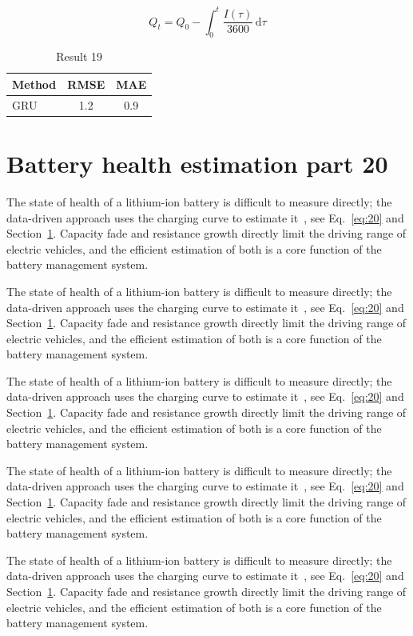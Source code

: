 \documentclass[11pt]{article}
\begin{document}
\begin{equation}\label{eq:19}
  Q_t = Q_0 - \int_0^t \frac{I(\tau)}{3600}\,\mathrm{d}\tau
\end{equation}
\begin{table}[h]\centering\begin{tabular}{lcc}\toprule Method & RMSE & MAE\\\midrule GRU & 1.2 & 0.9\\\bottomrule\end{tabular}\caption{Result 19}\end{table}

\section{Battery health estimation part 20}\label{sec:20}
The state of health of a lithium-ion battery is difficult to measure directly; the data-driven approach uses the charging curve to estimate it~\cite{a2020}, see Eq.~\eqref{eq:20} and Section~\ref{sec:20}. Capacity fade and resistance growth directly limit the driving range of electric vehicles, and the efficient estimation of both is a core function of the battery management system.

The state of health of a lithium-ion battery is difficult to measure directly; the data-driven approach uses the charging curve to estimate it~\cite{a2020}, see Eq.~\eqref{eq:20} and Section~\ref{sec:20}. Capacity fade and resistance growth directly limit the driving range of electric vehicles, and the efficient estimation of both is a core function of the battery management system.

The state of health of a lithium-ion battery is difficult to measure directly; the data-driven approach uses the charging curve to estimate it~\cite{a2020}, see Eq.~\eqref{eq:20} and Section~\ref{sec:20}. Capacity fade and resistance growth directly limit the driving range of electric vehicles, and the efficient estimation of both is a core function of the battery management system.

The state of health of a lithium-ion battery is difficult to measure directly; the data-driven approach uses the charging curve to estimate it~\cite{a2020}, see Eq.~\eqref{eq:20} and Section~\ref{sec:20}. Capacity fade and resistance growth directly limit the driving range of electric vehicles, and the efficient estimation of both is a core function of the battery management system.

The state of health of a lithium-ion battery is difficult to measure directly; the data-driven approach uses the charging curve to estimate it~\cite{a2020}, see Eq.~\eqref{eq:20} and Section~\ref{sec:20}. Capacity fade and resistance growth directly limit the driving range of electric vehicles, and the efficient estimation of both is a core function of the battery management system.
\end{document}
